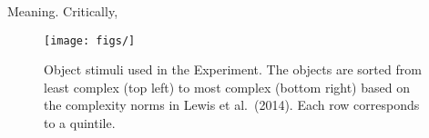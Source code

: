 \documentclass[10pt,letterpaper]{article}
\newcommand{\squeezeup}{\vspace{-1.5mm}}
\begin{document}
\cite{wichmann2011phonological}
\cite{wichmann2008languagephonological}
\cite{smith2010eliminating}
\cite{slobin1982children}

\cite{sapir1912language}
\cite{reali2014paradox}


\cite{lupyanrole}\cite{lupyan2010language}
\cite{kirby2008cumulative}
Meaning. \cite{silvey2015word}
\cite{perfors2011language}
Critically, 




\begin{figure}[b!]
\begin{center}
\texttt{[image: figs/]}
\end{center}
\vspace{-.24em}
\caption{Object stimuli used in the Experiment. The objects are sorted from least complex (top left) to most complex (bottom right) based on the complexity norms in Lewis et al.\ (2014). Each row corresponds to a quintile.}
\label{fig:objs}
\vspace{-1em}
\end{figure}







\setlength{\bibleftmargin}{.125in}
\setlength{\bibindent}{-\bibleftmargin}


\end{document}
